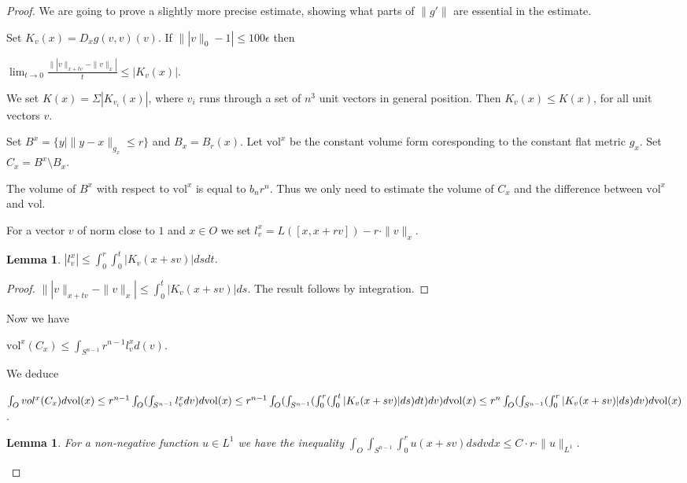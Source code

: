 \documentclass[12pt,leqno,intlimits]{amsart}
\numberwithin{equation}{section}
\newtheorem{lem}[thm]{Lemma}
\theoremstyle{definition}
\theoremstyle{remark}
\newcommand{\vol}{\mathrm{vol}}
\begin{document}
\begin{proof}
We are going to prove a slightly more precise estimate, showing what parts of $\|g'\|$ are essential in the estimate.


Set $K_v (x) = D_x g(v,v) (v)$.  
If $\||v\|_0 -1| \leq 100\epsilon$  then

 $\lim _{t\to 0} \frac {\||v\|_{x+tv} - \|v\| _x|} t \leq |K_v (x)|$.

 We set $K(x)= \Sigma |K_{v_i}(x)|$, where $v_i$ runs through a set of $n^3$ unit vectors in general position.
 Then $K_v(x) \leq K (x)$, for all unit vectors $v$.

 Set $B^x = \{ y | \|y-x\| _{g_x} \leq r \}$ and $B_x = B_r (x)$.  Let $\vol ^x$ be the constant
 volume form coresponding to the constant flat metric $g_x$.
   Set $C_x = B^x \setminus B_x$.

   The volume of $B^x$ with respect to $\vol ^x$ is equal to $b_n r^n$. Thus we only need to estimate
  the volume of $C_x$ and the difference between $\vol ^x$ and $\vol$.

 For a vector $v$ of norm close to $1$ and $x\in O$ we set
 $l_v ^x = L ([x,x+rv]) - r \cdot \| v\| _x$.

 \begin{lem}
 $|l_v ^x| \leq \int _0 ^r  \int _0 ^t | K_v (x+sv)| ds dt$.
 \end{lem}


 \begin{proof}
 $\||v\|_{x+tv} -\|v\| _x| \leq \int _0 ^t  |K_v (x+sv)| ds$. The result follows by integration.
  \end{proof}


   Now we have

   $\vol ^x (C_x) \leq \int _{S^{n-1}} r^{n-1} l^x _v d(v) $.


    We deduce

    $\int _O vol ^x (C_x) d\vol (x) \leq r^{n-1} \int _O (\int _{S^{n-1}} l_v ^x dv) d\vol (x) \leq \\
    r^{n-1} \int _O (\int _{S^{n-1}} (\int _0 ^r (\int _0 ^t |K_v (x+sv)| ds)dt)dv)d\vol (x) \leq \\
    r^n \int _O (\int _{S^{n-1}} (\int _0 ^r |K_v (x+sv)| ds) dv)d\vol (x)$.


    \begin{lem}
    For a non-negative function $u\in L^1$ we have the inequality
    $\int _O \int _{S^{n-1}} \int _0^r u(x+sv) ds dv dx \leq C \cdot r \cdot \|u\| _{L^1}$.
    \end{lem}



\end{proof}
\end{document}
